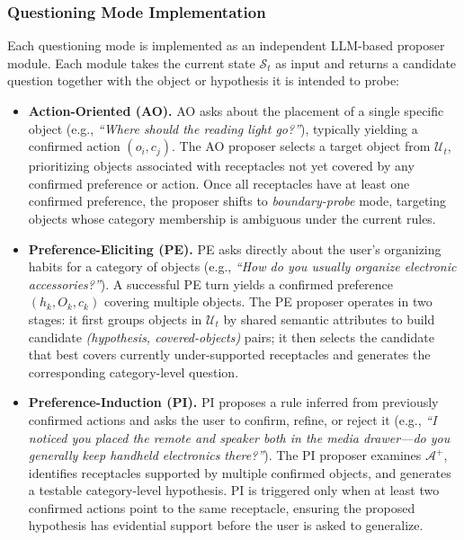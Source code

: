 \documentclass[manuscript,review,anonymous]{acmart}
\begin{document}
{\subsubsection{Questioning Mode Implementation}
\label{sec:question-modes}

Each questioning mode is implemented as an independent LLM-based proposer module. Each module takes the current state $\mathcal{S}_t$ as input and returns a candidate question together with the object or hypothesis it is intended to probe:

\begin{itemize}[leftmargin=*]
    \item \textbf{Action-Oriented (AO).} AO asks about the placement of a single specific object (e.g., \textit{``Where should the reading light go?''}), typically yielding a confirmed action $(o_i, c_j)$. The AO proposer selects a target object from $\mathcal{U}_t$, prioritizing objects associated with receptacles not yet covered by any confirmed preference or action. Once all receptacles have at least one confirmed preference, the proposer shifts to \textit{boundary-probe} mode, targeting objects whose category membership is ambiguous under the current rules.
    \item \textbf{Preference-Eliciting (PE).} PE asks directly about the user's organizing habits for a category of objects (e.g., \textit{``How do you usually organize electronic accessories?''}). A successful PE turn yields a confirmed preference $(h_k, O_k, c_k)$ covering multiple objects. The PE proposer operates in two stages: it first groups objects in $\mathcal{U}_t$ by shared semantic attributes to build candidate \textit{(hypothesis, covered-objects)} pairs; it then selects the candidate that best covers currently under-supported receptacles and generates the corresponding category-level question.
    \item \textbf{Preference-Induction (PI).} PI proposes a rule inferred from previously confirmed actions and asks the user to confirm, refine, or reject it (e.g., \textit{``I noticed you placed the remote and speaker both in the media drawer---do you generally keep handheld electronics there?''}). The PI proposer examines $\mathcal{A}^+$, identifies receptacles supported by multiple confirmed objects, and generates a testable category-level hypothesis. PI is triggered only when at least two confirmed actions point to the same receptacle, ensuring the proposed hypothesis has evidential support before the user is asked to generalize.
\end{itemize}

}
\end{document}
